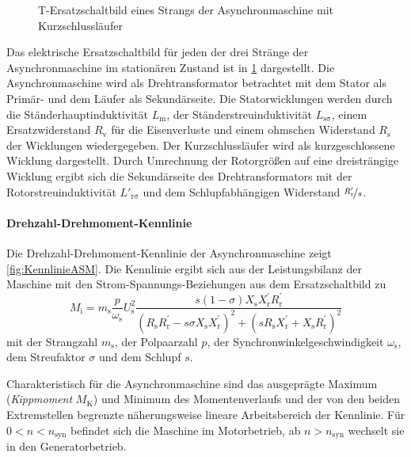 \begin{figure}[b]
    \centering
    
    \caption{T-Ersatzschaltbild eines Strangs der Asynchronmaschine mit Kurzschlussläufer}
    \label{fig:ESB_ASM}
\end{figure}

Das elektrische Ersatzschaltbild für jeden der drei Stränge der Asynchronmaschine im stationären Zustand ist in \cref{fig:ESB_ASM} dargestellt. Die Asynchronmaschine wird als Drehtransformator betrachtet mit dem Stator als Primär- und dem Läufer als Sekundärseite. Die Statorwicklungen werden durch die Ständerhauptinduktivität $L_{\mathrm{m}}$, der Ständerstreuinduktivität $L_{\mathrm{s\sigma}}$, einem Ersatzwiderstand $R_{\mathrm{v}}$ für die Eisenverluste und einem ohmschen Widerstand $R_{\mathrm{s}}$ der Wicklungen wiedergegeben. Der Kurzschlussläufer wird als kurzgeschlossene Wicklung dargestellt. Durch Umrechnung der Rotorgrößen auf eine dreisträngige Wicklung ergibt sich die Sekundärseite des Drehtransformators mit der Rotorstreuinduktivität $L'_{\mathrm{r\sigma}}$ und dem Schlupfabhängigen Widerstand $\nicefrac{R'_{\mathrm{r}}}{s}$.

\paragraph{Drehzahl-Drehmoment-Kennlinie}
Die Drehzahl-Drehmoment-Kennlinie der Asynchronmaschine zeigt \cref{fig:KennlinieASM}. Die Kennlinie ergibt sich aus der Leistungsbilanz der Maschine mit den Strom-Spannungs-Beziehungen aus dem Ersatzschaltbild zu \begin{equation}
    M_{\mathrm{i}}=m_{\mathrm{s}} \frac{p}{\omega_{\mathrm{s}}} U_{\mathrm{s}}^{2} \frac{s(1-\sigma) X_{\mathrm{s}} X_{\mathrm{r}}^{\prime} R_{\mathrm{r}}^{\prime}}{\left(R_{\mathrm{s}} R_{\mathrm{r}}^{\prime}-s \sigma X_{\mathrm{s}} X_{\mathrm{r}}^{\prime}\right)^{2}+\left(s R_{\mathrm{s}} X_{\mathrm{r}}^{\prime}+X_{\mathrm{s}} R_{\mathrm{r}}^{\prime}\right)^{2}}
\end{equation} mit der Strangzahl $m_{\mathrm{s}}$, der Polpaarzahl $p$, der Synchronwinkelgeschwindigkeit $\omega_{\mathrm{s}}$, dem Streufaktor $\sigma$ und dem Schlupf $s$.

Charakteristisch für die Asynchronmaschine sind das ausgeprägte Maximum (\emph{Kippmoment} $M_{\mathrm K}$) und Minimum des Momentenverlaufs und der von den beiden Extremstellen begrenzte näherungsweise lineare Arbeitsbereich der Kennlinie. Für $0 < n < n_{\mathrm{syn}}$ befindet sich die Maschine im Motorbetrieb, ab $n > n_{\mathrm{syn}}$ wechselt sie in den Generatorbetrieb.

